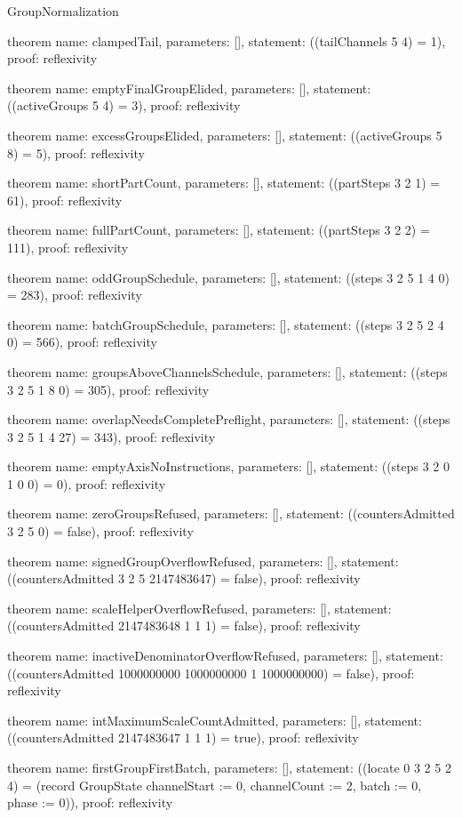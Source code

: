 \begin{lexlean}{GroupNormalization}
\begin{semanticmodule}
theorem{
  name: clampedTail,
  parameters: [],
  statement: ((tailChannels 5 4) = 1),
  proof: reflexivity{}
}

theorem{
  name: emptyFinalGroupElided,
  parameters: [],
  statement: ((activeGroups 5 4) = 3),
  proof: reflexivity{}
}

theorem{
  name: excessGroupsElided,
  parameters: [],
  statement: ((activeGroups 5 8) = 5),
  proof: reflexivity{}
}

theorem{
  name: shortPartCount,
  parameters: [],
  statement: ((partSteps 3 2 1) = 61),
  proof: reflexivity{}
}

theorem{
  name: fullPartCount,
  parameters: [],
  statement: ((partSteps 3 2 2) = 111),
  proof: reflexivity{}
}

theorem{
  name: oddGroupSchedule,
  parameters: [],
  statement: ((steps 3 2 5 1 4 0) = 283),
  proof: reflexivity{}
}

theorem{
  name: batchGroupSchedule,
  parameters: [],
  statement: ((steps 3 2 5 2 4 0) = 566),
  proof: reflexivity{}
}

theorem{
  name: groupsAboveChannelsSchedule,
  parameters: [],
  statement: ((steps 3 2 5 1 8 0) = 305),
  proof: reflexivity{}
}

theorem{
  name: overlapNeedsCompletePreflight,
  parameters: [],
  statement: ((steps 3 2 5 1 4 27) = 343),
  proof: reflexivity{}
}

theorem{
  name: emptyAxisNoInstructions,
  parameters: [],
  statement: ((steps 3 2 0 1 0 0) = 0),
  proof: reflexivity{}
}

theorem{
  name: zeroGroupsRefused,
  parameters: [],
  statement: ((countersAdmitted 3 2 5 0) = false),
  proof: reflexivity{}
}

theorem{
  name: signedGroupOverflowRefused,
  parameters: [],
  statement: ((countersAdmitted 3 2 5 2147483647) = false),
  proof: reflexivity{}
}

theorem{
  name: scaleHelperOverflowRefused,
  parameters: [],
  statement: ((countersAdmitted 2147483648 1 1 1) = false),
  proof: reflexivity{}
}

theorem{
  name: inactiveDenominatorOverflowRefused,
  parameters: [],
  statement: ((countersAdmitted 1000000000 1000000000 1 1000000000) = false),
  proof: reflexivity{}
}

theorem{
  name: intMaximumScaleCountAdmitted,
  parameters: [],
  statement: ((countersAdmitted 2147483647 1 1 1) = true),
  proof: reflexivity{}
}

theorem{
  name: firstGroupFirstBatch,
  parameters: [],
  statement: ((locate 0 3 2 5 2 4) = (record GroupState {channelStart := 0, channelCount := 2, batch := 0, phase := 0})),
  proof: reflexivity{}
}


\end{semanticmodule}
\end{lexlean}
